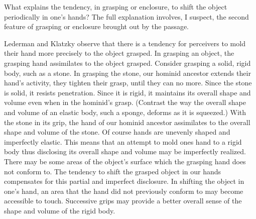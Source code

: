 \documentclass[12pt]{article}
\begin{document}
What explains the tendency, in grasping or enclosure, to shift the object periodically in one's hands? The full explanation involves, I suspect, the second feature of grasping or enclosure brought out by the passage. 

Lederman and Klatzky observe that there is a tendency for perceivers to mold their hand more precisely to the object grasped. In grasping an object, the grasping hand assimilates to the object grasped. Consider grasping a solid, rigid body, such as a stone. In grasping the stone, our hominid ancestor extends their hand's activity, they tighten their grasp, until they can no more. Since the stone is solid, it resists penetration. Since it is rigid, it maintains its overall shape and volume even when in the hominid's grasp. (Contrast the way the overall shape and volume of an elastic body, such a sponge, deforms as it is squeezed.) With the stone in its grip, the hand of our hominid ancestor assimilates to the overall shape and volume of the stone. Of course hands are unevenly shaped and imperfectly elastic. This means that an attempt to mold ones hand to a rigid body thus disclosing its overall shape and volume may be imperfectly realized. There may be some areas of the object's surface which the grasping hand does not conform to. The tendency to shift the grasped object in our hands compensates for this partial and imperfect disclosure. In shifting the object in one's hand, an area that the hand did not previously conform to may become accessible to touch. Successive grips may provide a better overall sense of the shape and volume of the rigid body. 
\end{document}
